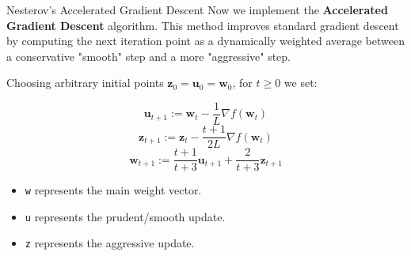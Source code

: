 \documentclass[10pt]{beamer}
\begin{document}
\begin{frame}{Nesterov's Accelerated Gradient Descent}
    Now we implement the \textbf{Accelerated Gradient Descent} algorithm. This method improves standard gradient descent by computing the next iteration point as a dynamically weighted average between a conservative "smooth" step and a more "aggressive" step. 

    \vspace{0.3cm}
    Choosing arbitrary initial points $\mathbf{z}_0 = \mathbf{u}_0 = \mathbf{w}_0$, for $t \ge 0$ we set:

    $$\mathbf{u}_{t+1} := \mathbf{w}_t - \frac{1}{L} \nabla f(\mathbf{w}_t)$$
    $$\mathbf{z}_{t+1} := \mathbf{z}_t - \frac{t+1}{2L} \nabla f(\mathbf{w}_t)$$
    $$\mathbf{w}_{t+1} := \frac{t+1}{t+3} \mathbf{u}_{t+1} + \frac{2}{t+3} \mathbf{z}_{t+1}$$

    \begin{itemize}
        \item \texttt{w} represents the main weight vector.
        \item \texttt{u} represents the prudent/smooth update.
        \item \texttt{z} represents the aggressive update.
    \end{itemize}
\end{frame}
\end{document}
